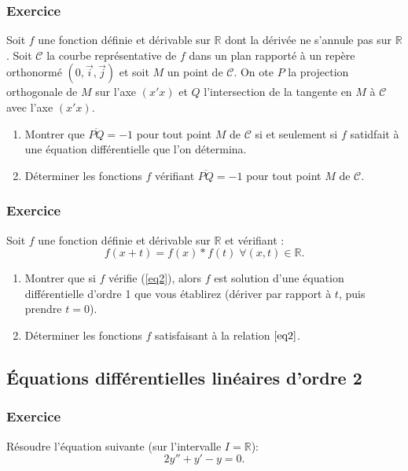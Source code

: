 \documentclass[10pt,a4paper]{article}
\begin{document}
\subsubsection{Exercice}
Soit $f$ une fonction définie et dérivable sur $\mathbb{R}$ dont la dérivée ne s'annule pas sur $\mathbb{R}$.
Soit $\mathcal{C}$ la courbe représentative de $f$ dans un plan rapporté à un repère orthonormé $(0,\vec{i},\vec{j})$ et soit $M$ un point de $\mathcal{C}$.
On ote $P$ la projection orthogonale de $M$ sur l'axe $(x'x)$ et $Q$ l'intersection de la tangente en $M$ à $\mathcal{C}$ avec l'axe $(x'x)$.
\begin{enumerate}
\item
Montrer que $\overline{PQ}=-1$ pour tout point $M$ de $\mathcal{C}$ si et seulement si $f$ satidfait à une équation différentielle que l'on détermina.
\item
Déterminer les fonctions $f$ vérifiant $\overline{PQ}=-1$ pour tout point $M$ de $\mathcal{C}$.
\end{enumerate}


\subsubsection{Exercice}
Soit $f$ une fonction définie et dérivable sur $\mathbb{R}$ et vérifiant :
\begin{equation}
\label{eq2}
f(x+t)=f(x)*f(t) \; \forall (x,t) \in \mathbb{R}.
\end{equation}

\begin{enumerate}
\item
Montrer que si $f$ vérifie (\ref{eq2}), alors $f$ est solution d'une équation différentielle d'ordre 1 que vous établirez (dériver par rapport à $t$, puis prendre $t=0$).

\item
Déterminer les fonctions $f$ satisfaisant à la relation $\ref{eq2}$.
\end{enumerate}

\subsection{Équations différentielles linéaires d'ordre 2}

\subsubsection{Exercice}
Résoudre l'équation suivante (sur l'intervalle $I=\mathbb{R}$):
$$2y''+y'-y=0.$$
\end{document}
